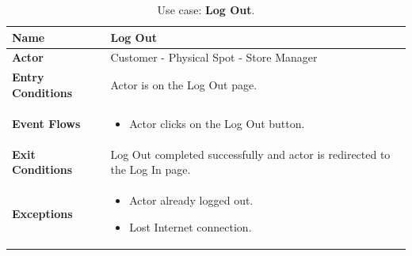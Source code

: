 \begin{table}[H]
    \centering
    \begin{tabular}{| m{} | m{} |}
        \hline
        \textbf{Name}            & Log Out                                                                    \\
        \hline
        \textbf{Actor}            & Customer - Physical Spot - Store Manager                                   \\
        \hline
        \textbf{Entry Conditions} & Actor is on the Log Out page.                                              \\
        \hline
        \textbf{Event Flows} &
        \begin{itemize}
            \item Actor clicks on the Log Out button.
        \end{itemize} \\
        \hline
        \textbf{Exit Conditions}  & Log Out completed successfully and actor is redirected to the Log In page. \\
        \hline
        \textbf{Exceptions} &
        \begin{itemize}
            \item Actor already logged out.
            \item Lost Internet connection.
        \end{itemize} \\
        \hline
    \end{tabular}
    \caption{Use case: \textbf{Log Out}.}
    \label{tableLogOut}
\end{table}

